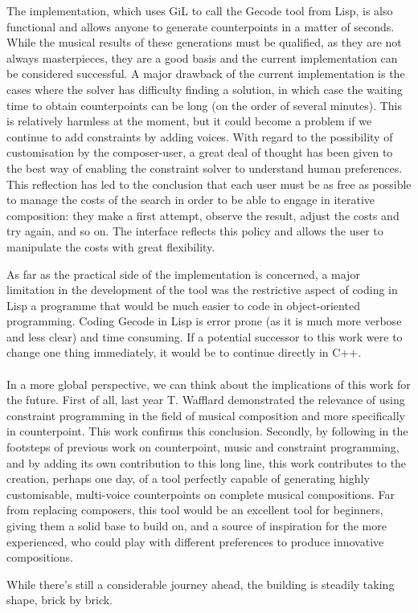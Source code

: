 The implementation, which uses GiL to call the Gecode tool from Lisp, is also functional and allows anyone to generate counterpoints in a matter of seconds. While the musical results of these generations must be qualified, as they are not always masterpieces, they are a good basis and the current implementation can be considered successful. A major drawback of the current implementation is the cases where the solver has difficulty finding a solution, in which case the waiting time to obtain counterpoints can be long (on the order of several minutes). This is relatively harmless at the moment, but it could become a problem if we continue to add constraints by adding voices.
With regard to the possibility of customisation by the composer-user, a great deal of thought has been given to the best way of enabling the constraint solver to understand human preferences. This reflection has led to the conclusion that each user must be as free as possible to manage the costs of the search in order to be able to engage in iterative composition: they make a first attempt, observe the result, adjust the costs and try again, and so on. The interface reflects this policy and allows the user to manipulate the costs with great flexibility. 

As far as the practical side of the implementation is concerned, a major limitation in the development of the tool was the restrictive aspect of coding in Lisp a programme that would be much easier to code in object-oriented programming. Coding Gecode in Lisp is error prone (as it is much more verbose and less clear) and time consuming. If a potential successor to this work were to change one thing immediately, it would be to continue directly in C++.

\paragraph{}
In a more global perspective, we can think about the implications of this work for the future.
First of all, last year T. Wafflard demonstrated the relevance of using constraint programming in the field of musical composition and more specifically in counterpoint. This work confirms this conclusion.
Secondly, by following in the footsteps of previous work on counterpoint, music and constraint programming, and by adding its own contribution to this long line, this work contributes to the creation, perhaps one day, of a tool perfectly capable of generating highly customisable, multi-voice counterpoints on complete musical compositions. Far from replacing composers, this tool would be an excellent tool for beginners, giving them a solid base to build on, and a source of inspiration for the more experienced, who could play with different preferences to produce innovative compositions.

While there's still a considerable journey ahead, the building is steadily taking shape, brick by brick.